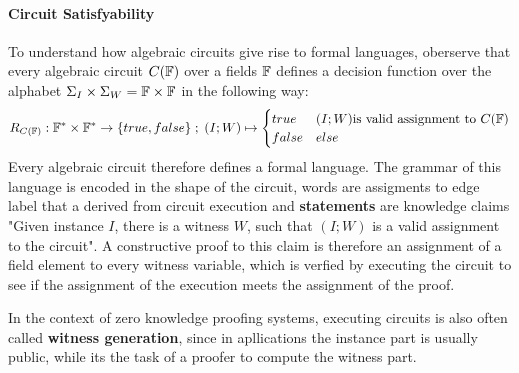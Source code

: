 \paragraph{Circuit Satisfyability} To understand how algebraic circuits give rise to formal languages, oberserve that every algebraic circuit $C(\mathbb{F})$ over a fields $\mathbb{F}$ defines a decision function over the alphabet $\Sigma_I \times \Sigma_W = \mathbb{F} \times \mathbb{F}$ in the following way:
\begin{equation}
R_{C(\mathbb{F})} : \mathbb{F}^* \times \mathbb{F}^* \to \{true, false\}\;;\;
(I;W) \mapsto
\begin{cases}
true & (I;W) \text{is valid assignment to } C(\mathbb{F})\\
false & else
\end{cases}
\end{equation}
Every algebraic circuit therefore defines a formal language. The grammar of this language is encoded in the shape of the circuit, words are assigments to edge label that a derived from circuit execution and \textbf{statements} are knowledge claims "Given instance $I$, there is a witness $W$, such that $(I;W)$ is a valid assignment to the circuit". A constructive proof to this claim is therefore an assignment of a field element to every witness variable, which is verfied by executing the circuit to see if the assignment of the execution meets the assignment of the proof. 

In the context of zero knowledge proofing systems, executing circuits is also often called \textbf{witness generation}, since in apllications the instance part is usually public, while its the task of a proofer to compute the witness part.

